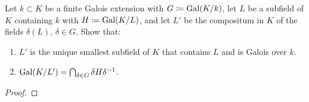\begin{problem}
Let $k\subset K$ be a finite Galois extension with $G\coloneq\operatorname{Gal}(K/k)$,
let $L$ be a subfield of $K$ containing $k$ with $H\coloneq\operatorname{Gal}(K/L)$, and
let $L'$ be the compositum in $K$ of the fields $\delta(L)$, $\delta\in
G$. Show that:
\begin{enumerate}[label=(\alph*),noitemsep]
\item $L'$ is the unique smallest subfield of $K$ that contains $L$ and is
  Galois over $k$.
\item $\operatorname{Gal}(K/L')=\bigcap_{\delta\in G}\delta H\delta^{-1}$.
\end{enumerate}
\end{problem}
\begin{proof}
\end{proof}

